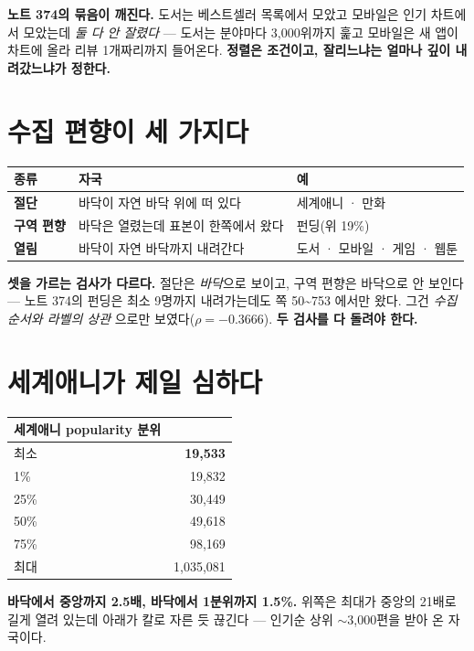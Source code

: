 \documentclass[11pt]{article}
\begin{document}
\textbf{노트 374의 묶음이 깨진다.} 도서는 베스트셀러 목록에서 모았고
모바일은 인기 차트에서 모았는데 \emph{둘 다 안 잘렸다} --- 도서는 분야마다
3,000위까지 훑고 모바일은 새 앱이 차트에 올라 리뷰 1개짜리까지 들어온다.
\textbf{정렬은 조건이고, 잘리느냐는 얼마나 깊이 내려갔느냐가 정한다.}

\section{수집 편향이 세 가지다}

\begin{center}
\begin{tabular}{lll}
\hline
종류 & 자국 & 예 \\
\hline
\textbf{절단} & 바닥이 자연 바닥 위에 떠 있다 & 세계애니 · 만화 \\
\textbf{구역 편향} & 바닥은 열렸는데 표본이 한쪽에서 왔다 & 펀딩(위 19\%) \\
\textbf{열림} & 바닥이 자연 바닥까지 내려간다 & 도서 · 모바일 · 게임 · 웹툰 \\
\hline
\end{tabular}
\end{center}

\textbf{셋을 가르는 검사가 다르다.} 절단은 \emph{바닥}으로 보이고, 구역
편향은 바닥으로 안 보인다 --- 노트 374의 펀딩은 최소 9명까지 내려가는데도
쪽 50\textasciitilde{}753 에서만 왔다. 그건 \emph{수집 순서와 라벨의 상관}
으로만 보였다($\rho=-0.3666$). \textbf{두 검사를 다 돌려야 한다.}

\section{세계애니가 제일 심하다}

\begin{center}
\begin{tabular}{lr}
\hline
세계애니 popularity 분위 & \\
\hline
최소 & \textbf{19,533} \\
1\% & 19,832 \\
25\% & 30,449 \\
50\% & 49,618 \\
75\% & 98,169 \\
최대 & 1,035,081 \\
\hline
\end{tabular}
\end{center}

\textbf{바닥에서 중앙까지 2.5배, 바닥에서 1분위까지 1.5\%.} 위쪽은 최대가
중앙의 21배로 길게 열려 있는데 아래가 칼로 자른 듯 끊긴다 --- 인기순
상위 $\sim$3,000편을 받아 온 자국이다.
\end{document}
